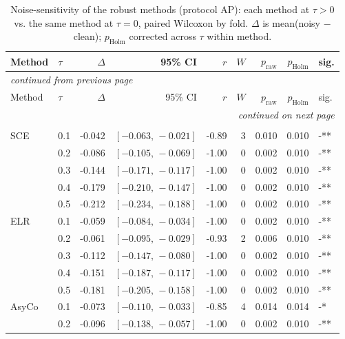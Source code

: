 
\begin{small}
\setlength{\LTcapwidth}{\textwidth}
\begin{longtable}{llrrrrrrl}
\caption{Noise-sensitivity of the robust methods (protocol AP): each method at $\tau>0$ vs. the same method at $\tau=0$, paired Wilcoxon by fold. $\Delta$ is mean(noisy $-$ clean); $p_{\mathrm{Holm}}$ corrected across $\tau$ within method.}\label{tab:app_noise_vs_clean_AP}\\
\toprule
Method & $\tau$ & $\Delta$ & 95\% CI & $r$ & $W$ & $p_{\mathrm{raw}}$ & $p_{\mathrm{Holm}}$ & sig. \\
\midrule
\endfirsthead
\multicolumn{9}{l}{\itshape\small continued from previous page}\\
\toprule
Method & $\tau$ & $\Delta$ & 95\% CI & $r$ & $W$ & $p_{\mathrm{raw}}$ & $p_{\mathrm{Holm}}$ & sig. \\
\midrule
\endhead
\midrule
\multicolumn{9}{r}{\itshape\small continued on next page}\\
\endfoot
\bottomrule
\endlastfoot
\addlinespace
\multicolumn{9}{l}{\textit{Balanced accuracy}} \\
SCE & 0.1 & -0.042 & $[-0.063,\,-0.021]$ & -0.89 & 3 & 0.010 & 0.010 & -** \\
 & 0.2 & -0.086 & $[-0.105,\,-0.069]$ & -1.00 & 0 & 0.002 & 0.010 & -** \\
 & 0.3 & -0.144 & $[-0.171,\,-0.117]$ & -1.00 & 0 & 0.002 & 0.010 & -** \\
 & 0.4 & -0.179 & $[-0.210,\,-0.147]$ & -1.00 & 0 & 0.002 & 0.010 & -** \\
 & 0.5 & -0.212 & $[-0.234,\,-0.188]$ & -1.00 & 0 & 0.002 & 0.010 & -** \\
ELR & 0.1 & -0.059 & $[-0.084,\,-0.034]$ & -1.00 & 0 & 0.002 & 0.010 & -** \\
 & 0.2 & -0.061 & $[-0.095,\,-0.029]$ & -0.93 & 2 & 0.006 & 0.010 & -** \\
 & 0.3 & -0.112 & $[-0.147,\,-0.080]$ & -1.00 & 0 & 0.002 & 0.010 & -** \\
 & 0.4 & -0.151 & $[-0.187,\,-0.117]$ & -1.00 & 0 & 0.002 & 0.010 & -** \\
 & 0.5 & -0.181 & $[-0.205,\,-0.158]$ & -1.00 & 0 & 0.002 & 0.010 & -** \\
AsyCo & 0.1 & -0.073 & $[-0.110,\,-0.033]$ & -0.85 & 4 & 0.014 & 0.014 & -* \\
 & 0.2 & -0.096 & $[-0.138,\,-0.057]$ & -1.00 & 0 & 0.002 & 0.010 & -** \\

\end{longtable}
\end{small}
